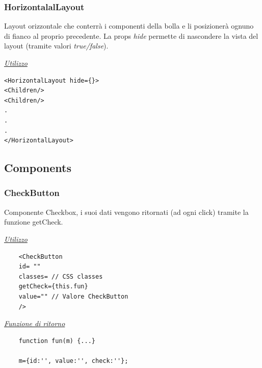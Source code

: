\subsubsection{HorizontalalLayout}
Layout orizzontale che conterrà i componenti della bolla e li posizionerà ognuno di fianco al proprio precedente. La props \textit{hide} permette di nascondere la vista del layout (tramite valori \textit{true/false}).
\begin{center}
\underline{\textit{Utilizzo}}
\begin{lstlisting}
<HorizontalLayout hide={}>
<Children/>
<Children/>
.
.
.
</HorizontalLayout>
\end{lstlisting}
\end{center}

\subsection{Components}

\subsubsection{CheckButton}

Componente Checkbox, i suoi dati vengono ritornati (ad ogni click) tramite la funzione getCheck.
\begin{center}
	\underline{\textit{Utilizzo}}
	\begin{lstlisting}
	<CheckButton
	id= ""
	classes= // CSS classes
	getCheck={this.fun}
	value="" // Valore CheckButton
	/>
	\end{lstlisting}
	\underline{\textit{Funzione di ritorno}}
	\begin{lstlisting}
	function fun(m) {...}
	
	m={id:'', value:'', check:''};
	\end{lstlisting}
\end{center}

